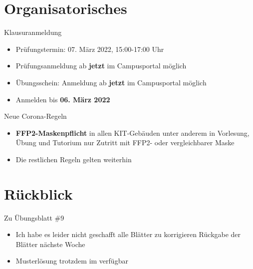 
\newcommand{\handout}{}



\morescalingdelimiters



\section{Organisatorisches}
\begin{frame}{Klausuranmeldung}
	\begin{itemize}
		\item Prüfungstermin: 07. März 2022, 15:00-17:00 Uhr
		\item Prüfungsanmeldung ab \textbf{jetzt} im Campusportal möglich
		\pause
		\item Übungsschein: Anmeldung ab \textbf{jetzt} im Campusportal möglich
		\item Anmelden bis \textbf{06. März 2022}
	\end{itemize}
\end{frame}

\begin{frame}{Neue Corona-Regeln}
	\begin{itemize}
		\item \textbf{FFP2-Maskenpflicht} in allen KIT-Gebäuden
		\implitem unter anderem in Vorlesung, Übung und Tutorium nur Zutritt mit FFP2- oder vergleichbarer Maske
		\item Die restlichen Regeln gelten weiterhin
	\end{itemize}
\end{frame}

\section{Rückblick}
\begin{frame}{Zu Übungsblatt \#9}
	\begin{itemize}[<+->]
		\item Ich habe es leider nicht geschafft alle Blätter zu korrigieren
		\implitem Rückgabe der Blätter nächste Woche
		\item Musterlösung trotzdem im \ILIAS verfügbar
	\end{itemize}
\end{frame}



